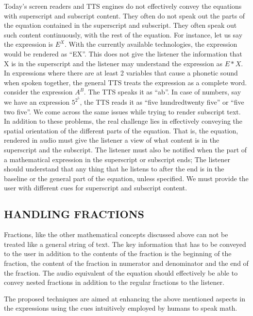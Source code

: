 \documentclass{article}
\begin{document}
Today’s screen readers and TTS engines do not effectively convey the equations with superscript and subscript content. They often do not speak out the parts of the equation contained in the superscript and subscript. They often speak out such content continuously, with the rest of the equation. For instance, let us say the expression is $E^X$. With the currently available technologies, the expression would be rendered as “EX”. This does not give the listener the information that X is in the superscript and the listener may understand the expression as $E*X$. In expressions where there are at least 2 variables that cause a phonetic sound when spoken together, the general TTS treats the expression as a complete word. consider the expression $A^B$. The TTS speaks it as “ab”. In case of numbers, say we have an expression $5^{2^5}$, the TTS reads it as “five hundredtwenty five” or “five two five”. We come across the same issues while trying to render subscript text. In addition to these problems, the real challenge lies in effectively conveying the spatial orientation of the different parts of the equation. That is, the equation, rendered in audio must give the listener a view of what content is in the superscript and the subscript. The listener must also be notified when the part of a mathematical expression in the superscript or subscript ends; The listener should understand that any thing that he listens to after the end is in the baseline or the general part of the equation, unless specified. We must provide the user with different cues for superscript and subscript content.


\subsection{HANDLING FRACTIONS}
\label{ssec:fractions}

Fractions, like the other mathematical concepts discussed above can not be treated like a general string of text. The key information that has to be conveyed to the user in addition to the contents of the fraction is the beginning of the fraction, the content of the fraction in numerator and denominator and the end of the fraction. The audio equivalent of the equation should effectively be able to convey nested fractions in addition to the regular fractions to the listener.


The proposed techniques are aimed at enhancing the above mentioned aspects in the expressions using the cues intuitively employed by humans to speak math. 
\end{document}
